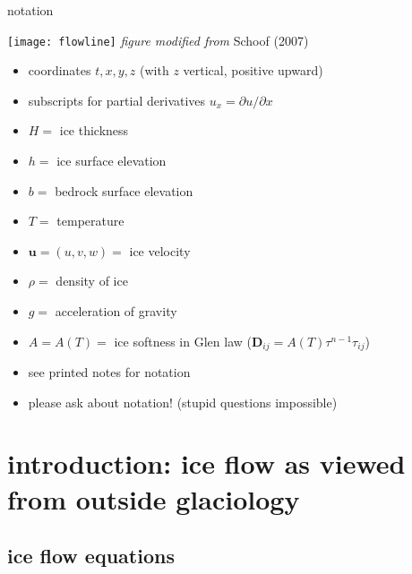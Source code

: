 \begin{frame}{notation} 

\begin{center}
  \texttt{[image: flowline]}
\tiny \emph{figure modified from} Schoof (2007)\nocite{SchoofMarine1}
\end{center}

\scriptsize
  \begin{itemize}
  \item coordinates $t,x,y,z$  (with $z$ vertical, positive upward)
  \item subscripts for partial derivatives $u_x = \partial u/\partial x$
  \item $H=$ ice thickness
  \item $h=$ ice surface elevation
  \item $b=$ bedrock surface elevation
  \item $T=$ temperature
  \item $\mathbf{u}=(u,v,w)=$ ice velocity
  \item $\rho=$ density of ice
  \item $g=$ acceleration of gravity
  \item $A=A(T)=$ ice softness in Glen law ($\mathbf{D}_{ij} = A(T) \tau^{n-1} \tau_{ij}$)
  \item \alert{see printed notes for notation}
  \item \alert{please ask about notation!}  (stupid questions impossible)
  \end{itemize}
\end{frame}


\section[introduction]{introduction: ice flow as viewed from outside glaciology}

\subsection{ice flow equations}

